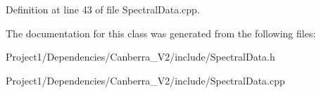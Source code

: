 Definition at line 43 of file Spectral\+Data.\+cpp.



The documentation for this class was generated from the following files\+:\begin{DoxyCompactItemize}
\item 
Project1/\+Dependencies/\+Canberra\+\_\+\+V2/include/Spectral\+Data.\+h\item 
Project1/\+Dependencies/\+Canberra\+\_\+\+V2/include/Spectral\+Data.\+cpp\end{DoxyCompactItemize}
